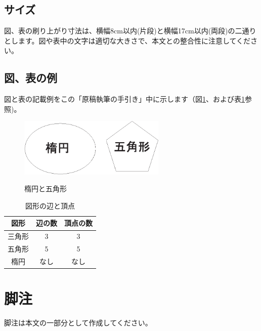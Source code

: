 \documentclass{hissymp}
\begin{document}
\subsection{サイズ}
図、表の刷り上がり寸法は、横幅8cm以内(片段)と横幅17cm以内(両段)の二通りとします。図や表中の文字は適切な大きさで、本文との整合性に注意してください。

\subsection{図、表の例}
図と表の記載例をこの「原稿執筆の手引き」中に示します（図\ref{fig:example1}、および表\ref{table:example2}参照)。

\begin{figure}[tb]
	\begin{center}
    \includegraphics[width=70mm]{fig1.eps}
	\caption{楕円と五角形}		%
	\label{fig:example1}
	\end{center}
\end{figure}

\begin{table}[t]
	\begin{center}
	\caption{図形の辺と頂点}		%
	\label{table:example2}
	\begin{tabular}[hbt]{c c c}
	\hline
	\bf 図形 & \bf 辺の数 & \bf 頂点の数\\
	\hline
	三角形 & 3 & 3\\
	五角形 & 5 & 5\\
	楕円 & なし & なし\\
	\hline
	\end{tabular}
	\end{center}
\end{table}


\section{脚注}
脚注は本文の一部分として作成してください。
\end{document}
